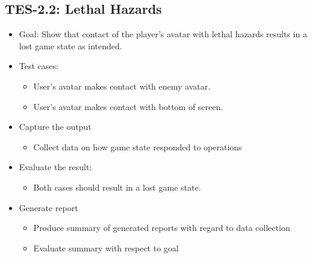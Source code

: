 \subsection{TES-2.2: Lethal Hazards }
\begin{itemize}
\item Goal: Show that contact of the player\textquoteright{}s avatar with
lethal hazards results in a lost game state as intended. 
\item Test cases: 

\begin{itemize}
\item User\textquoteright{}s avatar makes contact with enemy avatar. 
\item User\textquoteright{}s avatar makes contact with bottom of screen. 
\end{itemize}
\item Capture the output 

\begin{itemize}
\item Collect data on how game state responded to operations 
\end{itemize}
\item Evaluate the result: 

\begin{itemize}
\item Both cases should result in a lost game state. 
\end{itemize}
\item Generate report 

\begin{itemize}
\item Produce summary of generated reports with regard to data collection 
\item Evaluate summary with respect to goal
\end{itemize}
\end{itemize}

